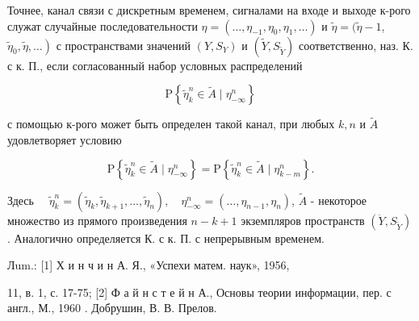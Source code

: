 \documentclass[10pt]{article}
\begin{document}
Точнее, канал связи с дискретным временем, сигналами на входе и выходе к-рого служат случайные последовательности $\eta=\left(\ldots, \eta_{-1}, \eta_{0}, \eta_{1}, \ldots\right)$ и $\tilde{\eta}=(\tilde{\eta}-1$, $\left.\tilde{\eta}_{0}, \tilde{\eta}, \ldots\right)$ с пространствами значений $\left(Y, S_{Y}\right)$ и $\left(\tilde{Y}, S_{\tilde{Y}}\right)$ соответственно, наз. К. с к. П., если согласованный набор условных распределений



\[

\mathrm{P}\left\{\tilde{\eta}_{k}^{n} \in \tilde{A} \mid \eta_{-\infty}^{n}\right\}

\]



с помощью к-рого может быть определен такой канал, при любых $k, n$ и $\tilde{A}$ удовлетворяет условию



\[

\mathrm{P}\left\{\tilde{\eta}_{k}^{n} \in \tilde{A} \mid \eta_{-\infty}^{n}\right\}=\mathrm{P}\left\{\tilde{\eta}_{k}^{n} \in \tilde{A} \mid \eta_{k-m}^{n}\right\} .

\]



Здесь $\quad \tilde{\eta}_{k}^{n}=\left(\tilde{\eta}_{k}, \tilde{\eta}_{k+1}, \ldots, \tilde{\eta}_{n}\right), \quad \eta_{-\infty}^{n}=\left(\ldots, \eta_{n-1}, \eta_{n}\right)$, $\tilde{A}$ - некоторое множество из прямого произведения $n-k+1$ экземпляров пространств $\left(\ddot{Y}, S_{\tilde{Y}}\right)$. Аналогично определяется К. с к. П. с непрерывным временем.



Лum.: [1] Х и н ч и н А. Я., «Успехи матем. наук», 1956,

11, в. 1, с. 17-75; [2] Ф а й н с т е й н А., Основы теории информации, пер. с англ., М., 1960 . Добрушин, В. В. Прелов.
\end{document}

